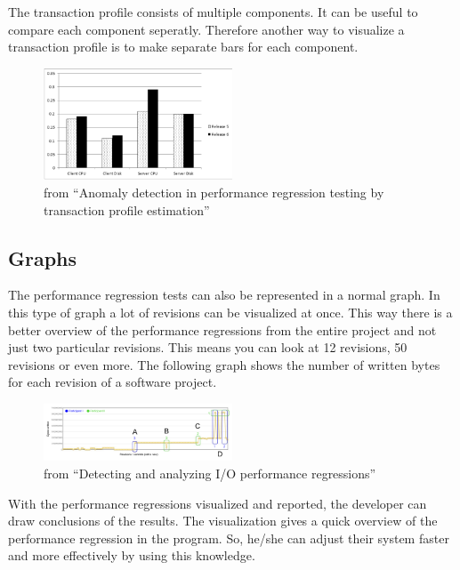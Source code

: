 The transaction profile consists of multiple components. It can be useful to compare each component seperatly. Therefore another way to visualize a transaction profile is to make separate bars for each component.

\begin{figure}[h]
\begin{center}
  \includegraphics[width=0.5\textwidth]{Figures/TPbars.png}
\end{center}
  \caption{from ``Anomaly detection in performance regression testing by transaction profile estimation''\cite{ghaith2015anomaly}}

\end{figure}
\newpage
\subsection{Graphs}
The performance regression tests can also be represented in a normal graph. In this type of graph a lot of revisions can be visualized at once. This way there is a better overview of the performance regressions from the entire project and not just two particular revisions. This means you can look at 12 revisions, 50 revisions or even more. The following graph shows the number of written bytes for each revision of a software project.

\begin{figure}[h]
\begin{center}
  \includegraphics[width=0.5\textwidth]{Figures/bytegraph.png}
\end{center}
  \caption{from ``Detecting and analyzing I/O performance regressions''\cite{bezemer2014detecting}}

\end{figure}
With the performance regressions visualized and reported, the developer can draw conclusions of the results. The visualization gives a quick overview of the performance regression in the program. So, he/she can adjust their system faster and more effectively by using this knowledge. 


